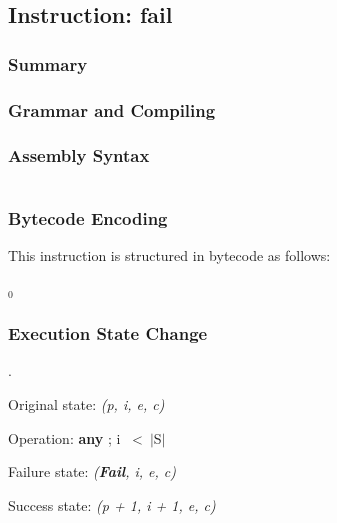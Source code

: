 \subsection{Instruction: fail}

\subsubsection{Summary}

\subsubsection{Grammar and Compiling}

\subsubsection{Assembly Syntax}

\begin{myquote}
\begin{verbatim}

\end{verbatim}
\end{myquote}
\subsubsection{Bytecode Encoding}

This instruction is structured in bytecode as follows:

$_0$\ 

\subsubsection{Execution State Change}

.

Original state: \textit{(p, i, e, c)}

Operation: \textbf{any} ; i \ \textless \ $\vert$S$\vert$

Failure state: \textit{(\textbf{Fail}, i, e, c)}

Success state: \textit{(p + 1, i + 1, e, c)}


